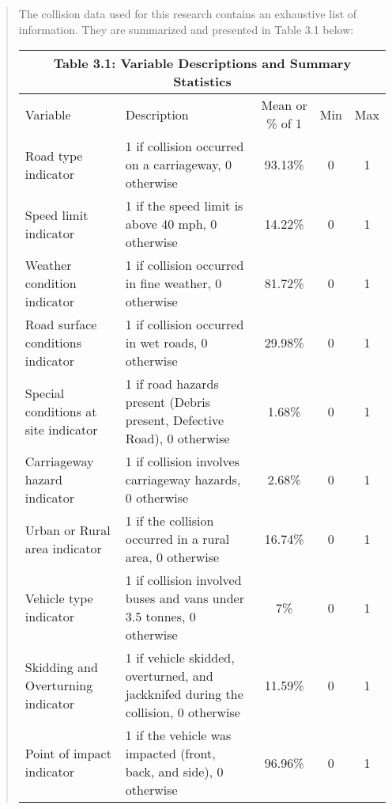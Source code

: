 \documentclass[12]{report}
\begin{document}
\begin{quote}
{\clearpage
The collision data used for this research contains an exhaustive list of information. They are summarized and presented in Table 3.1 below:
\vspace{0.04cm}

\begin{table}[H]
\renewcommand{\arraystretch}{1.06}
\centering
\begin{tabular}{p{4cm} p{8cm} c c c}
\toprule
\multicolumn{5}{c}{Table 3.1: Variable Descriptions and Summary Statistics} \\
\midrule
Variable & Description & Mean or \% of 1 & Min & Max \\ 
\midrule
Road type indicator & 1 if collision occurred on a carriageway, 0 otherwise & 93.13\% & 0 & 1 \\

Speed limit indicator & 1 if the speed limit is above 40 mph, 0 otherwise & 14.22\% & 0 & 1 \\

Weather condition indicator & 1 if collision occurred in fine weather, 0 otherwise & 81.72\% & 0 & 1 \\

Road surface conditions indicator & 1 if collision occurred in wet roads, 0 otherwise & 29.98\% & 0 & 1 \\

Special conditions at site indicator & 1 if road hazards present (Debris present, Defective Road), 0 otherwise & 1.68\% & 0 & 1 \\

Carriageway hazard indicator & 1 if collision involves carriageway hazards, 0 otherwise & 2.68\% & 0 & 1 \\

Urban or Rural area indicator & 1 if the collision occurred in a rural area, 0 otherwise & 16.74\% & 0 & 1 \\

Vehicle type indicator & 1 if collision involved buses and vans under 3.5 tonnes, 0 otherwise & 7\% & 0 & 1 \\

Skidding and Overturning indicator & 1 if vehicle skidded, overturned, and jackknifed during the collision, 0 otherwise & 11.59\% & 0 & 1 \\

Point of impact indicator & 1 if the vehicle was impacted (front, back, and side), 0 otherwise & 96.96\% & 0 & 1 \\


\end{tabular}
\end{table}}
\end{quote}
\end{document}
